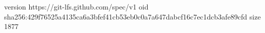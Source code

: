 version https://git-lfs.github.com/spec/v1
oid sha256:429f76525a4135ca6a3bfef41cb53eb0c0a7a647dabcf16c7ec1dcb3afe89cfd
size 1877
